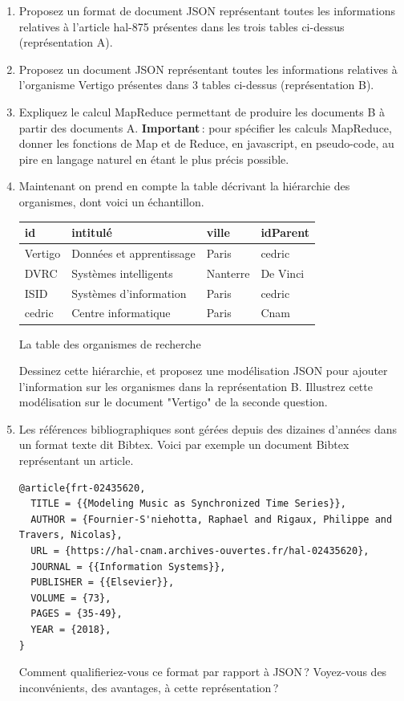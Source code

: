 \documentclass[11pt,a4paper]{article}
\newcommand{\cle}[1]{\textbf{#1}}
\begin{document}
\begin{enumerate}
  \item Proposez un format de document JSON représentant toutes les informations
        relatives à l'article hal-875 présentes dans les trois tables ci-dessus (représentation A).
        
  \item Proposez un document JSON représentant toutes les 
        informations relatives à l'organisme Vertigo présentes dans 3 tables ci-dessus
         (représentation B).
        
   \item Expliquez le calcul MapReduce permettant de produire les documents
   B à partir des documents A.
   \textbf{Important}\,: pour spécifier les calculs MapReduce, donner les fonctions de Map et de Reduce, en javascript,
en pseudo-code, au pire en langage naturel en étant le plus précis possible.
   
   
   \item Maintenant on prend en compte la table décrivant la hiérarchie des organismes,
         dont voici un échantillon.
         \begin{center}
         \begin{tabular}{l|l|l|l}
\cle{id} & intitulé & ville & idParent\\
\hline
Vertigo & Données et apprentissage & Paris & cedric \\
DVRC & Systèmes intelligents & Nanterre & De Vinci \\
ISID & Systèmes d'information & Paris &  cedric\\
cedric & Centre informatique  & Paris &  Cnam\\
\hline
\end{tabular}
\centerline{La table des organismes de recherche}
\end{center}

   Dessinez cette hiérarchie, et proposez une modélisation JSON pour ajouter l'information
   sur les organismes dans la représentation B. Illustrez cette modélisation
   sur le document "Vertigo" de la seconde question.
   
     \item Les références bibliographiques sont gérées depuis des dizaines d'années dans 
       un format texte dit Bibtex. Voici par exemple
       un document Bibtex représentant un article.
       
\begin{verbatim}
@article{frt-02435620,
  TITLE = {{Modeling Music as Synchronized Time Series}},
  AUTHOR = {Fournier-S'niehotta, Raphael and Rigaux, Philippe and Travers, Nicolas},
  URL = {https://hal-cnam.archives-ouvertes.fr/hal-02435620},
  JOURNAL = {{Information Systems}},
  PUBLISHER = {{Elsevier}},
  VOLUME = {73},
  PAGES = {35-49},
  YEAR = {2018},
}
\end{verbatim}
       
       Comment qualifieriez-vous ce format par rapport à JSON\,? Voyez-vous
        des inconvénients, des avantages, à cette représentation\,?

\end{enumerate}
\end{document}
